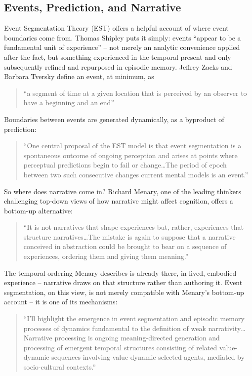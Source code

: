 \documentclass[11pt,a4paper]{article}
\begin{document}
\subsection{Events, Prediction, and Narrative}
Event Segmentation Theory (EST) offers a helpful account of where event boundaries come from. Thomas Shipley puts it simply: events ``appear to be a fundamental unit of experience'' \citep[p.~5]{shipley2008invitation} -- not merely an analytic convenience applied after the fact, but something experienced in the temporal present and only subsequently refined and repurposed in episodic memory. Jeffrey Zacks and Barbara Tversky define an event, at minimum, as

\begin{quote}
``a segment of time at a given location that is perceived by an observer to have a beginning and an end'' \citep[p.~3]{zackstversky2001event}
\end{quote}

Boundaries between events are generated dynamically, as a byproduct of prediction:

\begin{quote}
``One central proposal of the EST model is that event segmentation is a spontaneous outcome of ongoing perception and arises at points where perceptual predictions begin to fail or change\ldots The period of epoch between two such consecutive changes current mental models is an event.'' \citep[p.~591]{shipleyzacks2008understanding}
\end{quote}

So where does narrative come in? Richard Menary, one of the leading thinkers challenging top-down views of how narrative might affect cognition, offers a bottom-up alternative:

\begin{quote}
``It is not narratives that shape experiences but, rather, experiences that structure narratives\ldots The mistake is again to suppose that a narrative conceived in abstraction could be brought to bear on a sequence of experiences, ordering them and giving them meaning.'' \citep[p.~79]{menary2008embodied}
\end{quote}

The temporal ordering Menary describes is already there, in lived, embodied experience -- narrative draws on that structure rather than authoring it. Event segmentation, on this view, is not merely compatible with Menary's bottom-up account -- it is one of its mechanisms:

\begin{quote}
``I'll highlight the emergence in event segmentation and episodic memory processes of dynamics fundamental to the definition of weak narrativity\ldots Narrative processing is ongoing meaning-directed generation and processing of emergent temporal structures consisting of related value-dynamic sequences involving value-dynamic selected agents, mediated by socio-cultural contexts.'' \citep[p.~124]{miller2023eventsweaknarrativity}
\end{quote}
\end{document}
